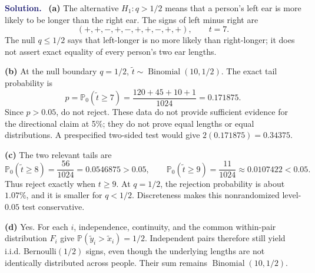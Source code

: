 \documentclass[11pt]{article}
\newcommand{\rv}[1]{\widetilde{#1}}
\newcommand{\Pbb}{\mathbb P}
\newenvironment{answer}{\par\medskip\noindent\textcolor{MidnightBlue}{\textbf{Solution.}}\ }{\par\medskip}
\begin{document}
\begin{answer}
\textbf{(a)} The alternative $H_1:q>1/2$ means that a person's left ear
is more likely to be longer than the right ear. The signs of
left minus right are
\[
 (+,+,-,+,-,+,+,-,+,+),\qquad \boxed{t=7}.
\]
The null $q\leq1/2$ says that left-longer is no more likely than right-longer;
it does not assert exact equality of every person's two ear lengths.

\textbf{(b)} At the null boundary $q=1/2$, $\rv t\sim\operatorname{Binomial}(10,1/2)$.
The exact tail probability is
\[
 p=\Pbb_0(\rv t\geq7)
 =\frac{120+45+10+1}{1024}
 =\boxed{0.171875}.
\]
Since $p>0.05$, do not reject. These data do not provide sufficient
evidence for the directional claim at 5\%; they do not prove equal
lengths or equal distributions. A prespecified two-sided test would give
$2(0.171875)=0.34375$.

\textbf{(c)} The two relevant tails are
\[
 \Pbb_0(\rv t\geq8)=\frac{56}{1024}=0.0546875>0.05,
 \qquad
 \Pbb_0(\rv t\geq9)=\frac{11}{1024}\approx0.0107422<0.05.
\]
Thus reject exactly when $\boxed{t\geq9}$.
At $q=1/2$, the rejection probability is about $1.07\%$, and it is smaller
for $q<1/2$. Discreteness makes this nonrandomized level-$0.05$ test conservative.

\textbf{(d)} Yes. For each $i$, independence, continuity, and the common
within-pair distribution $F_i$ give
$\Pbb(\rv y_i>\rv x_i)=1/2$. Independent pairs therefore still yield
i.i.d. Bernoulli$(1/2)$ signs, even though the underlying lengths are
not identically distributed across people. Their sum remains
$\boxed{\operatorname{Binomial}(10,1/2)}$.
\end{answer}

\newpage
\end{document}
